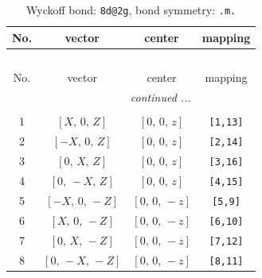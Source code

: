 \documentclass[fleqn,8pt]{jsarticle}
\begin{document}
\renewcommand{\arraystretch}{1.2}
\begin{longtable}{cccc}
\caption{Wyckoff bond: {\tt 8d@2g}, bond symmetry: {\tt .m.}}
 \\
 \hline \hline
No. & vector & center & mapping \\ \hline \endfirsthead

\multicolumn{3}{l}{\tablename\ \thetable{}} \\
 \hline \hline
No. & vector & center & mapping \\ \hline \endhead

 \hline \hline
\multicolumn{3}{r}{\footnotesize\it continued ...} \\ \endfoot

 \hline \hline
\multicolumn{3}{r}{} \\ \endlastfoot

1 & $\left[ X,\, 0,\, Z \right]$ & $\left[ 0,\, 0,\, z \right]$ & {\tt [1,13]} \\ \hline
2 & $\left[ - X,\, 0,\, Z \right]$ & $\left[ 0,\, 0,\, z \right]$ & {\tt [2,14]} \\ \hline
3 & $\left[ 0,\, X,\, Z \right]$ & $\left[ 0,\, 0,\, z \right]$ & {\tt [3,16]} \\ \hline
4 & $\left[ 0,\, - X,\, Z \right]$ & $\left[ 0,\, 0,\, z \right]$ & {\tt [4,15]} \\ \hline
5 & $\left[ - X,\, 0,\, - Z \right]$ & $\left[ 0,\, 0,\, - z \right]$ & {\tt [5,9]} \\ \hline
6 & $\left[ X,\, 0,\, - Z \right]$ & $\left[ 0,\, 0,\, - z \right]$ & {\tt [6,10]} \\ \hline
7 & $\left[ 0,\, X,\, - Z \right]$ & $\left[ 0,\, 0,\, - z \right]$ & {\tt [7,12]} \\ \hline
8 & $\left[ 0,\, - X,\, - Z \right]$ & $\left[ 0,\, 0,\, - z \right]$ & {\tt [8,11]} \\
\end{longtable}
\renewcommand{\arraystretch}{1.2}
\end{document}
